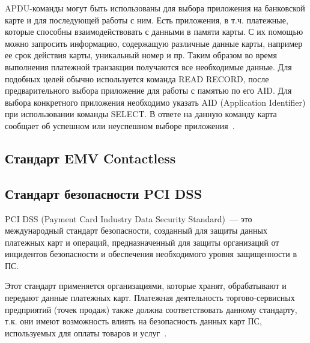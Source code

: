 APDU-команды могут быть использованы для выбора приложения на банковской карте и для последующей работы с ним.
Есть приложения, в т.ч. платежные, которые способны взаимодействовать с данными в памяти карты.
С их помощью можно запросить информацию, содержащую различные данные карты, например ее срок действия карты, уникальный номер и пр.
Таким образом во время выполнения платежной транзакции получаются все необходимые данные.
Для подобных целей обычно используется команда READ RECORD, после предварительного выбора приложение для работы с памятью по его AID.
Для выбора конкретного приложения необходимо указать AID (Application Identifier) при использовании команды SELECT.
В ответе на данную команду карта сообщает об успешном или неуспешном выборе приложения~\cite{medium_apdu2_1}.

\subsection{Стандарт EMV Contactless}









\subsection{Стандарт безопасности PCI DSS}

PCI DSS (Payment Card Industry Data Security Standard)~--- это международный стандарт безопасности, созданный для защиты данных платежных карт и операций, предназначенный для защиты организаций от инцидентов безопасности и обеспечения необходимого уровня защищенности в ПС.
 
Этот стандарт применяется организациями, которые хранят, обрабатывают и передают данные платежных карт.
Платежная деятельность торгово-сервисных предприятий (точек продаж) также должна соответствовать данному стандарту, т.к. они имеют возможность влиять на безопасность данных карт ПС, используемых для оплаты товаров и услуг~\cite{nspk_security}.

